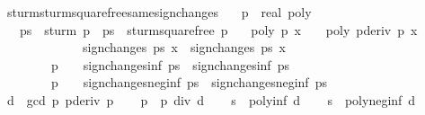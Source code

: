 \begin{isabellebody}
%
\endisatagproof
{\isafoldproof}%
%
\isadelimproof
\isanewline
%
\endisadelimproof
\isanewline
{}\isamarkupfalse%
\ sturm{\isacharunderscore}sturm{\isacharunderscore}squarefree{\isacharprime}{\isacharunderscore}same{\isacharunderscore}sign{\isacharunderscore}changes{\isacharcolon}\isanewline
\ \ \ p\ {\isacharcolon}{\isacharcolon}\ {\isachardoublequoteopen}real\ poly{\isachardoublequoteclose}\isanewline
\ \ \ {\isachardoublequoteopen}ps\ {\isasymequiv}\ sturm\ p{\isachardoublequoteclose}\ \ {\isachardoublequoteopen}ps{\isacharprime}\ {\isasymequiv}\ sturm{\isacharunderscore}squarefree{\isacharprime}\ p{\isachardoublequoteclose}\isanewline
\ \ \ {\isachardoublequoteopen}poly\ p\ x\ {\isasymnoteq}\ {}\ {\isasymor}\ poly\ {\isacharparenleft}pderiv\ p{\isacharparenright}\ x\ {\isasymnoteq}\ {}\ {\isasymLongrightarrow}\isanewline
\ \ \ \ \ \ \ \ \ \ \ \ \ sign{\isacharunderscore}changes\ ps{\isacharprime}\ x\ {\isacharequal}\ sign{\isacharunderscore}changes\ ps\ x{\isachardoublequoteclose}\isanewline
\ \ \ \ \ \ \ \ {\isachardoublequoteopen}p\ {\isasymnoteq}\ {}\ {\isasymLongrightarrow}\ sign{\isacharunderscore}changes{\isacharunderscore}inf\ ps{\isacharprime}\ {\isacharequal}\ sign{\isacharunderscore}changes{\isacharunderscore}inf\ ps{\isachardoublequoteclose}\isanewline
\ \ \ \ \ \ \ \ {\isachardoublequoteopen}p\ {\isasymnoteq}\ {}\ {\isasymLongrightarrow}\ sign{\isacharunderscore}changes{\isacharunderscore}neg{\isacharunderscore}inf\ ps{\isacharprime}\ {\isacharequal}\ sign{\isacharunderscore}changes{\isacharunderscore}neg{\isacharunderscore}inf\ ps{\isachardoublequoteclose}\isanewline
%
\isadelimproof
%
\endisadelimproof
%
\isatagproof
{}\isamarkupfalse%
{\isacharminus}\isanewline
\ \ \isamarkupfalse%
\ d\ {\isasymequiv}\ {\isachardoublequoteopen}gcd\ p\ {\isacharparenleft}pderiv\ p{\isacharparenright}{\isachardoublequoteclose}\isanewline
\ \ \isamarkupfalse%
\ p{\isacharprime}\ {\isasymequiv}\ {\isachardoublequoteopen}p\ div\ d{\isachardoublequoteclose}\isanewline
\ \ \isamarkupfalse%
\ s{\isacharprime}\ {\isasymequiv}\ {\isachardoublequoteopen}poly{\isacharunderscore}inf\ d{\isachardoublequoteclose}\isanewline
\ \ \isamarkupfalse%
\ s{\isacharprime}{\isacharprime}\ {\isasymequiv}\ {\isachardoublequoteopen}poly{\isacharunderscore}neg{\isacharunderscore}inf\ d{\isachardoublequoteclose}\isanewline
\isanewline
\ \ \isacommand{{\isacharbraceleft}}\isamarkupfalse%

\end{isabellebody}
